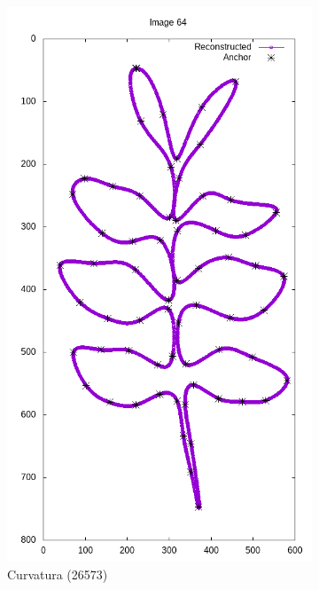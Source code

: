 \begin{frame}
\begin{figure}[ht!]
\begin{subfigure}[t]{0.24\textwidth}
			\includegraphics[width=\textwidth]{img/rec/64cur(26573).png}
			\caption{Curvatura (26573)}
		\end{subfigure}
		\begin{subfigure}[t]{0.24\textwidth}
			\centering

\end{subfigure}
\end{figure}
\end{frame}
